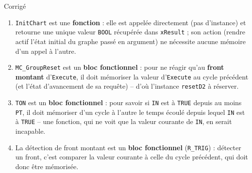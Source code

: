 \begin{UPSTIactivite}

\begin{UPSTIcorrectionP}{Corrigé}
\begin{enumerate}
    \item \texttt{InitChart} est une \textbf{fonction} : elle est appelée
    directement (pas d'instance) et retourne une unique valeur
    \texttt{BOOL} récupérée dans \texttt{xResult} ; son action (rendre
    actif l'état initial du graphe passé en argument) ne nécessite aucune
    mémoire d'un appel à l'autre.
    \item \texttt{MC\_GroupReset} est un \textbf{bloc fonctionnel} : pour
    ne réagir qu'au \textbf{front montant} d'\texttt{Execute}, il doit
    mémoriser la valeur d'\texttt{Execute} au cycle précédent (et l'état
    d'avancement de sa requête) -- d'où l'instance
    \texttt{resetD2} à réserver.
    \item \texttt{TON} est un \textbf{bloc fonctionnel} : pour savoir si
    \texttt{IN} est à \texttt{TRUE} depuis au moins \texttt{PT}, il doit
    mémoriser d'un cycle à l'autre le temps écoulé depuis lequel
    \texttt{IN} est à \texttt{TRUE} -- une fonction, qui ne voit que la
    valeur courante de \texttt{IN}, en serait incapable.
    \item La détection de front montant est un \textbf{bloc fonctionnel}
    (\texttt{R\_TRIG}) : détecter un front, c'est comparer la valeur
    courante à celle du cycle précédent, qui doit donc être mémorisée.
\end{enumerate}
\end{UPSTIcorrectionP}


\end{UPSTIactivite}
